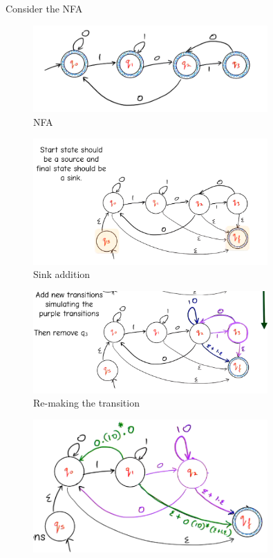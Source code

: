 \documentclass[a4paper]{article}
\theoremstyle{plain}
\theoremstyle{definition}
\newtheorem{exmp}{Example}[section]
\theoremstyle{remark}
\begin{document}
	\begin{tcolorbox}[colback=black!3!white,colframe=black!60!white,breakable,enhanced,title=\begin{exmp}NFA To Regular Expression \label{NFA To Regular Expression}\end{exmp}]
	Consider the NFA
	\begin{figure}[H]
		\centering
		\includegraphics[width=0.8\textwidth]{six.png}
		\caption{NFA}
		\label{fig:six-png}
	\end{figure}
	\begin{figure}[H]
		\centering
		\includegraphics[width=0.8\textwidth]{seven.png}
		\caption{Sink addition}
		\label{fig:seven-png}
	\end{figure}
	\begin{figure}[H]
		\centering
		\includegraphics[width=0.8\textwidth]{eight.png}
		\caption{Re-making the transition}
		\label{fig:eight-png}
	\end{figure}	
	\begin{figure}[H]
		\centering
		\includegraphics[width=0.8\textwidth]{nine.png}

\end{figure}
\end{tcolorbox}
\end{document}
